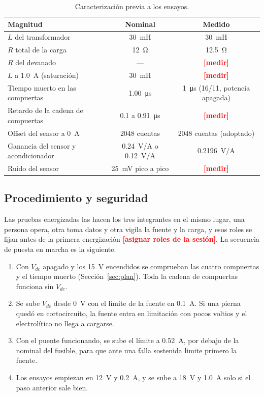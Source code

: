 \documentclass[journal]{IEEEtran}
\newcommand{\pendiente}[1]{\textcolor{red}{\textbf{[#1]}}}
\begin{document}
\begin{table}[!ht]
	\centering
	\caption{Caracterización previa a los ensayos.}
	\label{tab:caract}
	\begin{tabular}{lcc}
		\toprule
		Magnitud & Nominal & Medido \\
		\midrule
		$L$ del transformador & \SI{30}{mH} & \SI{30}{mH} \\
		$R$ total de la carga & \SI{12}{\ohm} & \SI{12.5}{\ohm} \\
		$R$ del devanado & --- & \pendiente{medir} \\
		$L$ a \SI{1.0}{A} (saturación) & \SI{30}{mH} & \pendiente{medir} \\
		Tiempo muerto en las compuertas & \SI{1.00}{\micro s} & \SI{1}{\micro s} (16/11, potencia apagada) \\
		Retardo de la cadena de compuertas & \num{0.1} a \SI{0.91}{\micro s} & \pendiente{medir} \\
		Offset del sensor a \SI{0}{A} & \num{2048} cuentas & \num{2048} cuentas (adoptado) \\
		Ganancia del sensor y acondicionador & \SI{0.24}{V/A} o \SI{0.12}{V/A} & \SI{0.2196}{V/A} \\
		Ruido del sensor & \SI{25}{mV} pico a pico & \pendiente{medir} \\
		\bottomrule
	\end{tabular}
\end{table}

\subsection{Procedimiento y seguridad}
\label{sec:seguridad}
Las pruebas energizadas las hacen los tres integrantes en el mismo lugar, una persona opera, otra toma datos y otra vigila la fuente y la carga, y esos roles se fijan antes de la primera energización \pendiente{asignar roles de la sesión}. La secuencia de puesta en marcha es la siguiente.

\begin{enumerate}
	\item Con $V_{dc}$ apagado y los \SI{15}{V} encendidos se comprueban las cuatro compuertas y el tiempo muerto (Sección~\ref{sec:plan}). Toda la cadena de compuertas funciona sin $V_{dc}$.
	\item Se sube $V_{dc}$ desde \SI{0}{V} con el límite de la fuente en \SI{0.1}{A}. Si una pierna quedó en cortocircuito, la fuente entra en limitación con pocos voltios y el electrolítico no llega a cargarse.
	\item Con el puente funcionando, se sube el límite a \SI{0.52}{A}, por debajo de la nominal del fusible, para que ante una falla sostenida limite primero la fuente.
	\item Los ensayos empiezan en \SI{12}{V} y \SI{0.2}{A}, y se sube a \SI{18}{V} y \SI{1.0}{A} solo si el paso anterior sale bien.
\end{enumerate}
\end{document}
